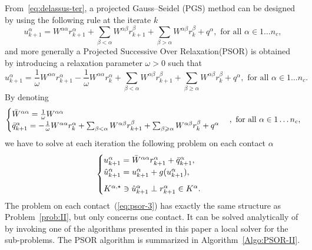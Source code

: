 From~\eqref{eq:delassus-ter}, a projected Gauss--Seidel (PGS) method can be designed by using the following rule at the iterate $k$
\begin{equation}
  \label{eq:pgs-1}
  u^{\alpha}_{k+1} = W^{\alpha\alpha} r^{\alpha}_{k+1} + \sum_{\beta < \alpha}W^{\alpha\beta} r^{\beta}_{k+1} + \sum_{\beta > \alpha}W^{\alpha\beta} r^{\beta}_{k} +  q^\alpha, \text{ for all } \alpha \in 1\ldots n_c,
\end{equation}
and more generally a Projected Successive Over Relaxation(PSOR) is obtained by introducing a relaxation parameter $\omega>0$ such that
\begin{equation}
  \label{eq:psor-1}
  u^{\alpha}_{k+1} = \frac 1 \omega W^{\alpha\alpha} r^{\alpha}_{k+1} 
  - \frac 1 \omega W^{\alpha\alpha} r^{\alpha}_{k} +
  \sum_{\beta < \alpha}W^{\alpha\beta} r^{\beta}_{k+1} + \sum_{\beta \geq \alpha}W^{\alpha\beta} r^{\beta}_{k} +  q^\alpha, \text{ for all } \alpha \in 1\ldots n_c.
\end{equation}
By denoting 
\begin{equation}
  \label{eq:psor-2}
  \begin{cases}
    \Bar W^{\alpha\alpha} = \frac 1 \omega W^{\alpha\alpha} \\
    \bar q^{\alpha}_{k+1} = - \frac 1 \omega W^{\alpha\alpha} r^{\alpha}_{k}
    + \sum_{\beta < \alpha}W^{\alpha\beta} r^{\beta}_{k+1} + \sum_{\beta
      \geq \alpha}W^{\alpha\beta} r^{\beta}_{k} + q^\alpha
  \end{cases}
, \text{ for all } \alpha \in 1\ldots n_c,
\end{equation}
we have to solve at each iteration the following problem on each contact $\alpha$
\begin{equation}\label{eq:psor-3}
  \begin{cases}
    u^{\alpha}_{k+1} =  \Bar W^{\alpha\alpha}  r^{\alpha}_{k+1} + \bar q^{\alpha}_{k+1}, \\
    \hat u^{\alpha}_{k+1} =u^{\alpha}_{k+1} + g(u^{\alpha}_{k+1}), \\[2mm]
    K^{\alpha,\star} \ni {\hat u^{\alpha}_{k+1}} \perp r^{\alpha}_{k+1} \in K^\alpha.
  \end{cases}
\end{equation}
The problem on each contact~(\ref{eq:psor-3}) has exactly the same structure as Problem~\ref{prob:II}, but only concerns one contact. It can be solved analytically of by invoking one of the algorithms presented in this paper a local solver for the sub-problems. The PSOR algorithm is summarized in Algorithm~\ref{Algo:PSOR-II}.

